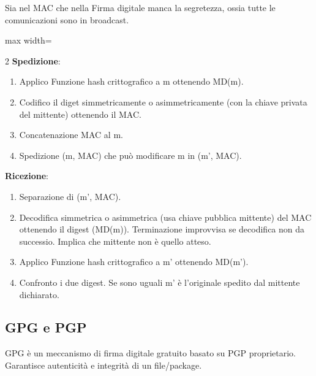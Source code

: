 Sia nel MAC che nella Firma digitale manca la segretezza, ossia tutte le comunicazioni sono in broadcast.
\begin{center}
	\begin{adjustbox}{max width=\textwidth}
	\end{adjustbox}
\end{center}
\begin{paracol}{2}
	\noindent\textbf{Spedizione}:
	\begin{enumerate}
		\item Applico Funzione hash crittografico a m ottenendo MD(m).
		\item Codifico il diget simmetricamente o asimmetricamente (con la chiave privata del mittente) ottenendo il MAC.
		\item Concatenazione MAC al m.
		\item Spedizione (m, MAC) che può modificare m in (m', MAC).
	\end{enumerate}
	\switchcolumn
	\noindent\textbf{Ricezione}:
	\begin{enumerate}
		\item Separazione di (m', MAC).
		\item Decodifica simmetrica o asimmetrica (usa chiave pubblica mittente) del MAC ottenendo il digest (MD(m)).
		Terminazione improvvisa se decodifica non da successio. Implica che mittente non è quello atteso.
		\item Applico Funzione hash crittografico a m' ottenendo MD(m').
		\item Confronto i due digest. Se sono uguali m' è l'originale spedito dal mittente dichiarato.
	\end{enumerate}
\end{paracol}

\subsection{GPG e PGP}
GPG è un meccanismo di firma digitale gratuito basato su PGP proprietario. Garantisce autenticità e integrità di un file/package.

